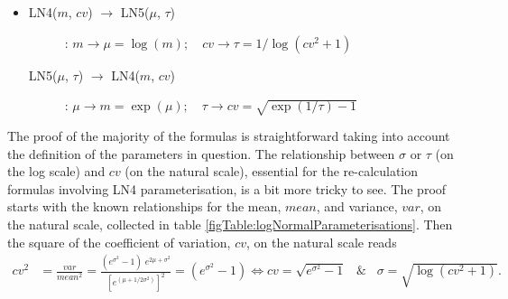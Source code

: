 {\begin{itemize}
\item 
\begin{description}
\item[LN4($m$, $cv$) $\rightarrow$ LN5($\mu$, $\tau$)]:
$m \rightarrow \mu=\log(m); \quad cv \rightarrow \tau=1/\log(cv^2+1)$

\item[LN5($\mu$, $\tau$) $\rightarrow$ LN4($m$, $cv$)]:
$\mu \rightarrow m = \exp(\mu); \quad \tau \rightarrow cv=\sqrt{\exp(1/\tau)-1}$
\end{description}
\end{itemize}

The proof of the majority of the formulas is straightforward taking into account the definition
of the parameters in question. The relationship between $\sigma$ or $\tau$ (on the log scale) 
and $cv$ (on the natural scale), essential for the re-calculation formulas involving
LN4 parameterisation, is a bit more tricky to see. The 
proof starts with the known relationships for the mean, $mean$, and variance, $var$, on the natural 
scale, collected in table \ref{figTable:logNormalParameterisations}. 
Then the square of the coefficient of variation, $cv$, on the natural scale reads
\begin{align}
	cv^2 &= \frac{var}{mean^2} = \frac{(e^{\sigma^2}-1)\; e^{2\mu + \sigma^2}}{[e^{(\mu + 1/2\sigma^2)}]^2}
	= (e^{\sigma^2}-1) \Leftrightarrow cv = \sqrt{e^{\sigma^2}-1} \;\;\; \& \;\;\; \sigma=\sqrt{\log(cv^2 + 1)}. \nonumber
\end{align}





}
